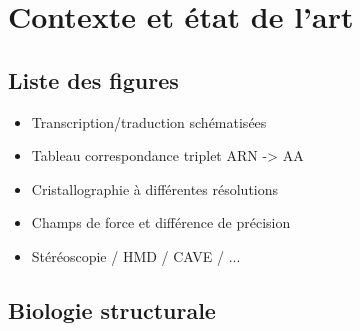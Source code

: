 \chapter[L'immersion pour la Biologie structurale]{Contexte et état de l'art}
\minitoc
\cleardoublepage


\section{Liste des figures}

\begin{itemize}
	\item Transcription/traduction schématisées
	\item Tableau correspondance triplet ARN -> AA
	\item Cristallographie à différentes résolutions
	\item Champs de force et différence de précision
	\item Stéréoscopie / HMD / CAVE / ...
\end{itemize}

\section{Biologie structurale}

